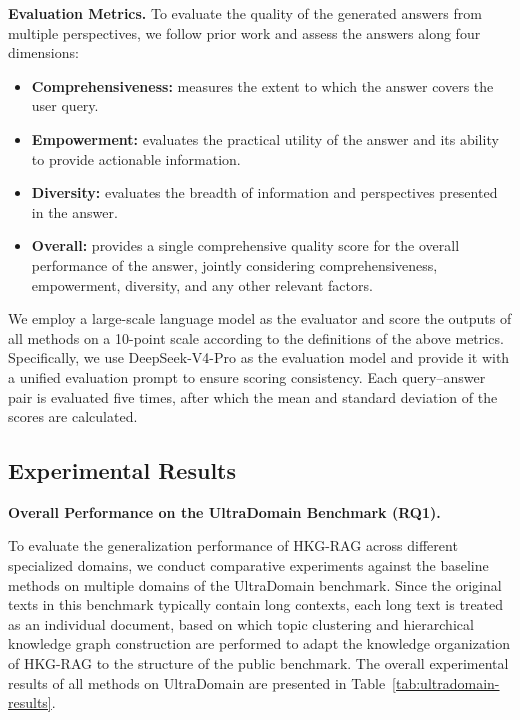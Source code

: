 \documentclass[preprint,12pt,authoryear]{elsarticle}
\begin{document}
\textbf{Evaluation Metrics.}
To evaluate the quality of the generated answers from multiple perspectives, we follow prior work \citep{zhang2026leanrag} and assess the answers along four dimensions:

\begin{itemize}
    \item \textbf{Comprehensiveness:} measures the extent to which the answer covers the user query.
    \item \textbf{Empowerment:} evaluates the practical utility of the answer and its ability to provide actionable information.
    \item \textbf{Diversity:} evaluates the breadth of information and perspectives presented in the answer.
    \item \textbf{Overall:} provides a single comprehensive quality score for the overall performance of the answer, jointly considering comprehensiveness, empowerment, diversity, and any other relevant factors.
\end{itemize}

We employ a large-scale language model as the evaluator and score the outputs of all methods on a 10-point scale according to the definitions of the above metrics. Specifically, we use DeepSeek-V4-Pro \citep{deepseek2026v4} as the evaluation model and provide it with a unified evaluation prompt to ensure scoring consistency. Each query--answer pair is evaluated five times, after which the mean and standard deviation of the scores are calculated.

\subsection{Experimental Results}
\label{subsec:experimental-results}

%
\noindent\textbf{Overall Performance on the UltraDomain Benchmark (RQ1).}

To evaluate the generalization performance of HKG-RAG across different specialized domains, we conduct comparative experiments against the baseline methods on multiple domains of the UltraDomain benchmark. Since the original texts in this benchmark typically contain long contexts, each long text is treated as an individual document, based on which topic clustering and hierarchical knowledge graph construction are performed to adapt the knowledge organization of HKG-RAG to the structure of the public benchmark. The overall experimental results of all methods on UltraDomain are presented in Table~\ref{tab:ultradomain-results}.
\end{document}

